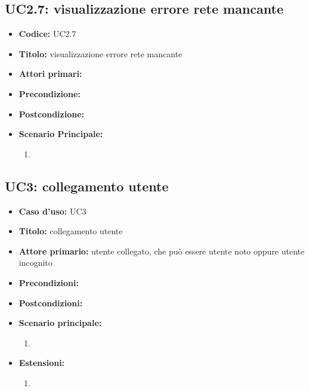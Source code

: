 ﻿\documentclass[../analisi-dei-requisiti]{subfiles}
\begin{document}
\subsection{UC2.7: visualizzazione errore rete mancante}
\label{sub:uc2.1utente}
\begin{itemize}
  \item \textbf{Codice:} UC2.7
  \item \textbf{Titolo:} visualizzazione errore rete mancante
  \item \textbf{Attori primari:}
  \item \textbf{Precondizione:}
  \item \textbf{Postcondizione:}
  \item \textbf{Scenario Principale:}
  \begin{enumerate}
    \item
  \end{enumerate}
\end{itemize}


\subsection{UC3: collegamento utente}
\label{sub:uc3utente}


\begin{itemize}
  \item \textbf{Caso d’uso:} UC3
  \item \textbf{Titolo:} collegamento utente
  \item \textbf{Attore primario:} utente collegato, che può essere utente noto oppure utente incognito
  \item \textbf{Precondizioni:} 
  \item \textbf{Postcondizioni:} 
  \item \textbf{Scenario principale:} 
  \begin{enumerate}
    \item
  \end{enumerate}
  \item \textbf{Estensioni:} 
  \begin{enumerate}
    \item
  \end{enumerate}
\end{itemize}
\end{document}
